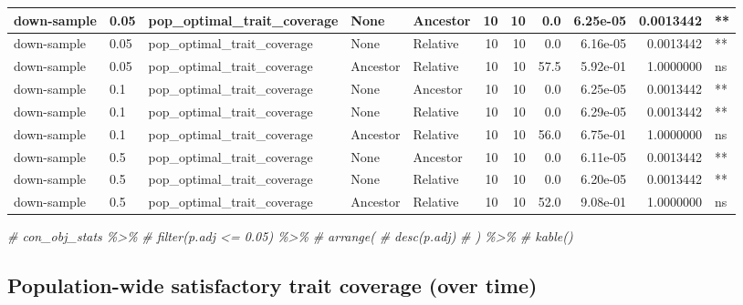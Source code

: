 \documentclass[
]{book}
\newenvironment{Shaded}{\begin{snugshade}}{\end{snugshade}}
\newcommand{\CommentTok}[1]{\textcolor[rgb]{0.56,0.35,0.01}{\textit{#1}}}
\begin{document}
\begin{tabular}{l|l|l|l|l|r|r|r|r|r|l}
\hline
down-sample & 0.05 & pop\_optimal\_trait\_coverage & None & Ancestor & 10 & 10 & 0.0 & 6.25e-05 & 0.0013442 & **\\
\hline
down-sample & 0.05 & pop\_optimal\_trait\_coverage & None & Relative & 10 & 10 & 0.0 & 6.16e-05 & 0.0013442 & **\\
\hline
down-sample & 0.05 & pop\_optimal\_trait\_coverage & Ancestor & Relative & 10 & 10 & 57.5 & 5.92e-01 & 1.0000000 & ns\\
\hline
down-sample & 0.1 & pop\_optimal\_trait\_coverage & None & Ancestor & 10 & 10 & 0.0 & 6.25e-05 & 0.0013442 & **\\
\hline
down-sample & 0.1 & pop\_optimal\_trait\_coverage & None & Relative & 10 & 10 & 0.0 & 6.29e-05 & 0.0013442 & **\\
\hline
down-sample & 0.1 & pop\_optimal\_trait\_coverage & Ancestor & Relative & 10 & 10 & 56.0 & 6.75e-01 & 1.0000000 & ns\\
\hline
down-sample & 0.5 & pop\_optimal\_trait\_coverage & None & Ancestor & 10 & 10 & 0.0 & 6.11e-05 & 0.0013442 & **\\
\hline
down-sample & 0.5 & pop\_optimal\_trait\_coverage & None & Relative & 10 & 10 & 0.0 & 6.20e-05 & 0.0013442 & **\\
\hline
down-sample & 0.5 & pop\_optimal\_trait\_coverage & Ancestor & Relative & 10 & 10 & 52.0 & 9.08e-01 & 1.0000000 & ns\\
\hline
\end{tabular}

\begin{Shaded}
\begin{Highlighting}[]
\CommentTok{\# con\_obj\_stats \%\textgreater{}\%}
\CommentTok{\#   filter(p.adj \textless{}= 0.05) \%\textgreater{}\%}
\CommentTok{\#   arrange(}
\CommentTok{\#     desc(p.adj)}
\CommentTok{\#   ) \%\textgreater{}\%}
\CommentTok{\#   kable()}
\end{Highlighting}
\end{Shaded}

\hypertarget{population-wide-satisfactory-trait-coverage-over-time}{%
\subsection{Population-wide satisfactory trait coverage (over time)}\label{population-wide-satisfactory-trait-coverage-over-time}}
\end{document}
